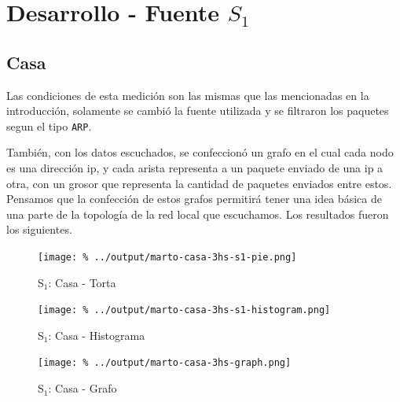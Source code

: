 \documentclass[final,inline,a4paper,narroweqnarray]{ieee}
\begin{document}
\section{Desarrollo - Fuente $S_1$}
  \subsection{Casa}

  Las condiciones de esta medición son las mismas que las mencionadas
  en la introducción, solamente se cambió la fuente utilizada y se
  filtraron los paquetes segun el tipo \texttt{ARP}.

  También, con los datos escuchados, se confeccionó un grafo en el
  cual cada nodo es una dirección ip, y cada arista representa a un
  paquete enviado de una ip a otra, con un grosor que representa la
  cantidad de paquetes enviados entre estos. Pensamos que la
  confección de estos grafos permitirá tener una idea básica de una
  parte de la topología de la red local que escuchamos. Los resultados
  fueron los siguientes.

    \begin{figure}[ht]\begin{center}
      \texttt{[image: \%
      ../output/marto-casa-3hs-s1-pie.png]}
      \vspace{-2em}
      \caption{S$_1$: Casa - Torta}
      \label{marto-casa-3hs-s1-pie}
    \end{center}\end{figure}

    \begin{figure}[ht]\begin{center}
      \texttt{[image: \%
      ../output/marto-casa-3hs-s1-histogram.png]}
      \vspace{-2em}
      \caption{S$_1$: Casa - Histograma}
      \label{marto-casa-3hs-s1-histogram}
    \end{center}\end{figure}

    \begin{figure}[ht]\begin{center}
      \texttt{[image: \%
      ../output/marto-casa-3hs-graph.png]}
      \vspace{-2em}
      \caption{S$_1$: Casa - Grafo}
      \label{marto-casa-3hs-graph}
    \end{center}\end{figure}
\end{document}
